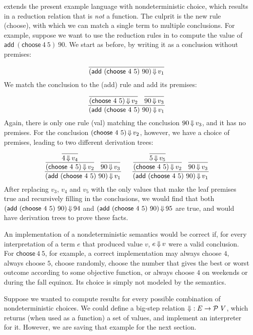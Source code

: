  extends the present example language with nondeterministic choice, which results in a reduction relation that is \emph{not} a function.
The culprit is the new rule (choose), with which we can match a single term to multiple conclusions.
For example, suppose we want to use the reduction rules in  to compute the value of $\mathsf{add}~(\mathsf{choose}~4~5)~90$.
We start as before, by writing it as a conclusion without premises:
\begin{equation}
	\dfrac{}{(\mathsf{add}~(\mathsf{choose}~4~5)~90) \operatorname{\Downarrow} v_1}
\end{equation}
We match the conclusion to the (add) rule and add its premises:
\begin{equation}
	\dfrac{
		\dfrac{}{(\mathsf{choose}~4~5) \operatorname{\Downarrow} v_2}
		\;\;\,
		\dfrac{}{90 \operatorname{\Downarrow} v_3}
	}{(\mathsf{add}~(\mathsf{choose}~4~5)~90) \operatorname{\Downarrow} v_1}
\end{equation}
Again, there is only one rule (val) matching the conclusion $90 \operatorname{\Downarrow} v_3$, and it has no premises.
For the conclusion $(\mathsf{choose}~4~5) \operatorname{\Downarrow} v_2$, however, we have a choice of premises, leading to two different derivation trees:
\begin{equation}
	\dfrac{
		\dfrac{
			\dfrac{}{4 \operatorname{\Downarrow} v_4}
		}{(\mathsf{choose}~4~5) \operatorname{\Downarrow} v_2}
		\;\;\,
		\dfrac{}{90 \operatorname{\Downarrow} v_3}
	}{(\mathsf{add}~(\mathsf{choose}~4~5)~90) \operatorname{\Downarrow} v_1}
	\;\;\,
	\;\;\,
	\dfrac{
		\dfrac{
			\dfrac{}{5 \operatorname{\Downarrow} v_5}
		}{(\mathsf{choose}~4~5) \operatorname{\Downarrow} v_2}
		\;\;\,
		\dfrac{}{90 \operatorname{\Downarrow} v_3}
	}{(\mathsf{add}~(\mathsf{choose}~4~5)~90) \operatorname{\Downarrow} v_1}
\end{equation}
After replacing $v_3$, $v_4$ and $v_5$ with the only values that make the leaf premises true and recursively filling in the conclusions, we would find that both $(\mathsf{add}~(\mathsf{choose}~4~5)~90) \operatorname{\Downarrow} 94$ and $(\mathsf{add}~(\mathsf{choose}~4~5)~90) \operatorname{\Downarrow} 95$ are true, and would have derivation trees to prove these facts.

An implementation of a nondeterministic semantics would be correct if, for every interpretation of a term $e$ that produced value $v$, $e \operatorname{\Downarrow} v$ were a valid conclusion.
For $\mathsf{choose}~4~5$, for example, a correct implementation may always choose $4$, always choose $5$, choose randomly, choose the number that gives the best or worst outcome according to some objective function, or always choose $4$ on weekends or during the fall equinox.
Its choice is simply not modeled by the semantics.

Suppose we wanted to compute results for every possible combination of nondeterministic choices.
We could define a big-step relation $\operatorname{\Downarrow} : E \to \mathcal{P}~V$, which returns (when used as a function) a set of values, and implement an interpreter for it.
However, we are saving that example for the next section.


